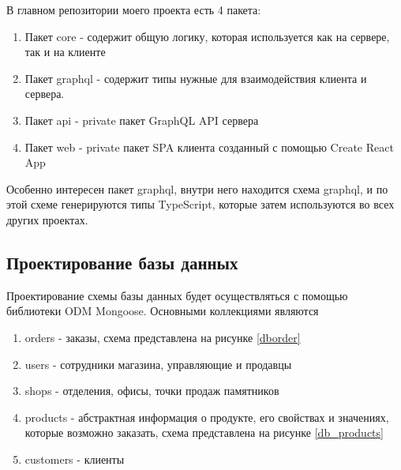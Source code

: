 \documentclass[a4paper,article,14pt]{extarticle}
\begin{document}
В главном репозитории моего проекта есть 4 пакета:

\begin{enumerate}
    \item Пакет core - содержит общую логику, которая используется как на сервере, так и на клиенте
    \item Пакет graphql - содержит типы нужные для взаимодействия клиента и сервера.
    \item Пакет api - private пакет GraphQL API сервера
    \item Пакет web - private пакет SPA клиента созданный с помощью Create React App
\end{enumerate}

Особенно интересен пакет graphql, внутри него находится схема graphql, и по этой схеме генерируются типы TypeScript, 
которые затем используются во всех других проектах.

\pagebreak

\subsection{Проектирование базы данных}

Проектирование схемы базы данных будет осуществляться с помощью библиотеки ODM Mongoose.
Основными коллекциями являются

\begin{enumerate}
    \item orders - заказы, схема представлена на рисунке \ref{dborder}
    \item users - сотрудники магазина, управляющие и продавцы
    \item shops - отделения, офисы, точки продаж памятников
    \item products - абстрактная информация о продукте, его свойствах и значениях, которые возможно заказать,
    схема представлена на рисунке \ref{db_products}
    \item customers - клиенты
\end{enumerate}
\end{document}
